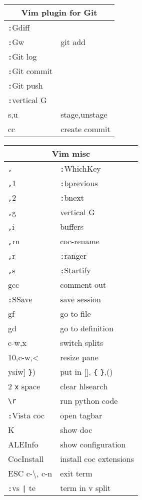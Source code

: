 \documentclass[12pt,paper=landscape,paper=a4]{scrartcl}
\begin{document}
\begin{multicols}{3}
    \begin{tabular}{ll}
        \multicolumn{2}{c}{Vim plugin for Git}\\
        \hline
        \verb!:!Gdiff          & \\
        \verb!:!Gw             & git add\\
        \verb!:!Git log        & \\
        \verb!:!Git commit     & \\
        \verb!:!Git push       & \\
        \verb!:!vertical G     & \\
        s,u  	        & stage,unstage\\
        cc		        & create commit\\
    \end{tabular}

    \vspace{1em}

    \begin{tabular}{ll}
        \multicolumn{2}{c}{Vim misc}\\
        \hline
        \verb!,! 		    & \verb!:!WhichKey\\
        \verb!,!1           & \verb!:!bprevious\\
        \verb!,!2           & \verb!:!bnext\\
        \verb!,!g           & vertical G\\
        \verb!,!i           & buffers\\
        \verb!,!rn          & coc-rename\\
        \verb!,!r           & \verb!:!ranger\\
        \verb!,!s           & \verb!:!Startify\\
        gcc                 & comment out\\
        \verb!:!SSave       & save session\\
        gf                  & go to file\\
        gd                  & go to definition\\
        c-w,x  	            & switch splits\\
        10,c-w,<            & resize pane\\
        ysiw] \verb!}!)     & put in [], \verb!{! \verb!}!,()\\
        2 \verb!x! space    & clear hlsearch\\
        \verb!\r!	        & run python code\\
        \verb!:!Vista coc   & open tagbar\\
        K                   & show doc\\
        ALEInfo             & show configuration \\
        CocInstall          & install coc extensions\\
        ESC c-\textbackslash{}, c-n     & exit term \\
        \verb!:!vs \verb!|! te          & term in v split
    \end{tabular}


\end{multicols}
\end{document}
